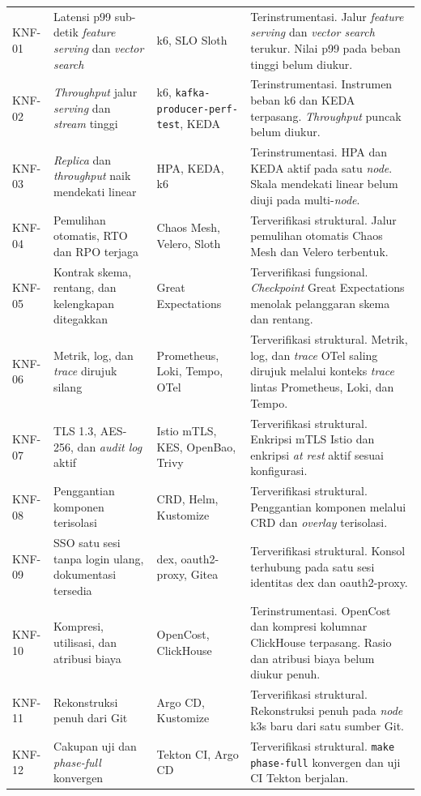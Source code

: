 {\begin{longtable}{|>{\centering\arraybackslash}m{1.7cm}|m{3.9cm}|m{2.8cm}|m{4.4cm}|}
\multicolumn{4}{|l|}{\textbf{Kebutuhan Nonfungsional}} \\
\hline
KNF-01 & Latensi p99 sub-detik \textit{feature serving} dan \textit{vector search} & k6, SLO Sloth & Terinstrumentasi. Jalur \textit{feature serving} dan \textit{vector search} terukur. Nilai p99 pada beban tinggi belum diukur. \\
\hline
KNF-02 & \textit{Throughput} jalur \textit{serving} dan \textit{stream} tinggi & k6, \texttt{kafka-producer-}\allowbreak\texttt{perf-test}, KEDA & Terinstrumentasi. Instrumen beban k6 dan KEDA terpasang. \textit{Throughput} puncak belum diukur. \\
\hline
KNF-03 & \textit{Replica} dan \textit{throughput} naik mendekati linear & HPA, KEDA, k6 & Terinstrumentasi. HPA dan KEDA aktif pada satu \textit{node}. Skala mendekati linear belum diuji pada multi-\textit{node}. \\
\hline
KNF-04 & Pemulihan otomatis, RTO dan RPO terjaga & Chaos Mesh, Velero, Sloth & Terverifikasi struktural. Jalur pemulihan otomatis Chaos Mesh dan Velero terbentuk. \\
\hline
KNF-05 & Kontrak skema, rentang, dan kelengkapan ditegakkan & Great Expectations & Terverifikasi fungsional. \textit{Checkpoint} Great Expectations menolak pelanggaran skema dan rentang. \\
\hline
KNF-06 & Metrik, log, dan \textit{trace} dirujuk silang & Prometheus, Loki, Tempo, OTel & Terverifikasi struktural. Metrik, log, dan \textit{trace} OTel saling dirujuk melalui konteks \textit{trace} lintas Prometheus, Loki, dan Tempo. \\
\hline
KNF-07 & TLS 1.3, AES-256, dan \textit{audit log} aktif & Istio mTLS, KES, OpenBao, Trivy & Terverifikasi struktural. Enkripsi mTLS Istio dan enkripsi \textit{at rest} aktif sesuai konfigurasi. \\
\hline
KNF-08 & Penggantian komponen terisolasi & CRD, Helm, Kustomize & Terverifikasi struktural. Penggantian komponen melalui CRD dan \textit{overlay} terisolasi. \\
\hline
KNF-09 & SSO satu sesi tanpa login ulang, dokumentasi tersedia & dex, oauth2-proxy, Gitea & Terverifikasi struktural. Konsol terhubung pada satu sesi identitas dex dan oauth2-proxy. \\
\hline
KNF-10 & Kompresi, utilisasi, dan atribusi biaya & OpenCost, ClickHouse & Terinstrumentasi. OpenCost dan kompresi kolumnar ClickHouse terpasang. Rasio dan atribusi biaya belum diukur penuh. \\
\hline
KNF-11 & Rekonstruksi penuh dari Git & Argo CD, Kustomize & Terverifikasi struktural. Rekonstruksi penuh pada \textit{node} k3s baru dari satu sumber Git. \\
\hline
KNF-12 & Cakupan uji dan \textit{phase-full} konvergen & Tekton CI, Argo CD & Terverifikasi struktural. \texttt{make phase-full} konvergen dan uji CI Tekton berjalan. \\
\hline

\end{longtable}
}
